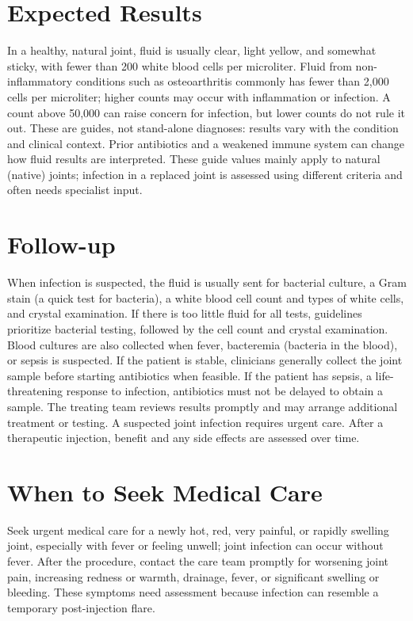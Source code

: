 \section*{Expected Results}
In a healthy, natural joint, fluid is usually clear, light yellow, and somewhat sticky, with fewer than 200 white blood cells per microliter. Fluid from non-inflammatory conditions such as osteoarthritis commonly has fewer than 2,000 cells per microliter; higher counts may occur with inflammation or infection. A count above 50,000 can raise concern for infection, but lower counts do not rule it out. These are guides, not stand-alone diagnoses: results vary with the condition and clinical context. Prior antibiotics and a weakened immune system can change how fluid results are interpreted. These guide values mainly apply to natural (native) joints; infection in a replaced joint is assessed using different criteria and often needs specialist input.

\section*{Follow-up}
When infection is suspected, the fluid is usually sent for bacterial culture, a Gram stain (a quick test for bacteria), a white blood cell count and types of white cells, and crystal examination. If there is too little fluid for all tests, guidelines prioritize bacterial testing, followed by the cell count and crystal examination. Blood cultures are also collected when fever, bacteremia (bacteria in the blood), or sepsis is suspected. If the patient is stable, clinicians generally collect the joint sample before starting antibiotics when feasible. If the patient has sepsis, a life-threatening response to infection, antibiotics must not be delayed to obtain a sample. The treating team reviews results promptly and may arrange additional treatment or testing. A suspected joint infection requires urgent care. After a therapeutic injection, benefit and any side effects are assessed over time.

\section*{When to Seek Medical Care}
Seek urgent medical care for a newly hot, red, very painful, or rapidly swelling joint, especially with fever or feeling unwell; joint infection can occur without fever. After the procedure, contact the care team promptly for worsening joint pain, increasing redness or warmth, drainage, fever, or significant swelling or bleeding. These symptoms need assessment because infection can resemble a temporary post-injection flare.

